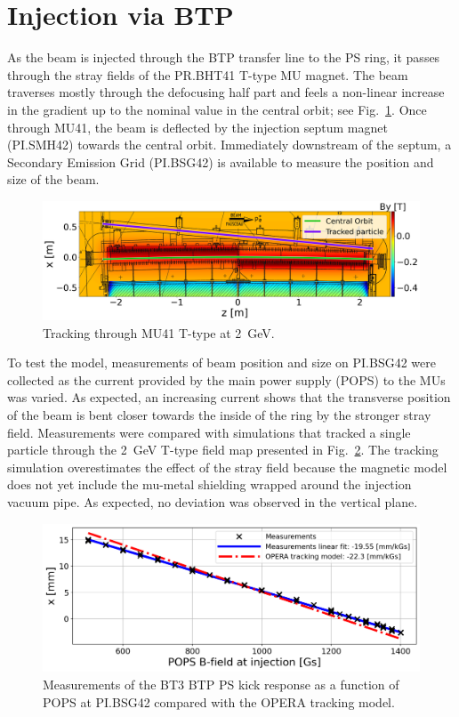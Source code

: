 \documentclass[a4paper,
               biblatex,     %
               keeplastbox,   %
               ]{jacow}
\begin{document}
\section{Injection via BTP}
As the beam is injected through the BTP transfer line to the PS ring, it passes through the stray fields of the PR.BHT41 T-type MU magnet. The beam traverses mostly through the defocusing half part and feels a non-linear increase in the gradient up to the nominal value in the central orbit; see Fig.~\ref{fig:injection_btp}. Once through MU41, the beam is deflected by the injection septum magnet (PI.SMH42) towards the central orbit. Immediately downstream of the septum, a Secondary Emission Grid (PI.BSG42) is available to measure the position and size of the beam.

\begin{figure}[!htb]
   \centering
   \includegraphics*[width=1.0\columnwidth]{MOPOTK030_f4.png}
   \caption{Tracking through MU41 T-type at \SI{2}{GeV}.}
   \label{fig:injection_btp}
\end{figure}

To test the model, measurements of beam position and size on PI.BSG42 were collected as the current provided by the main power supply (POPS) to the MUs was varied. As expected, an increasing current shows that the transverse position of the beam is bent closer towards the inside of the ring by the stronger stray field. Measurements were compared with simulations that tracked a single particle through the \SI{2}{GeV} T-type field map presented in Fig.~\ref{fig:injection_btp_transverse_position}. The tracking simulation overestimates the effect of the stray field because the magnetic model does not yet include the mu-metal shielding wrapped around the injection vacuum pipe. As expected, no deviation was observed in the vertical plane.

\begin{figure}[!htb]
   \centering
   \includegraphics*[width=1.0\columnwidth]{MOPOTK030_f5.png}
   \caption{Measurements of the BT3 BTP PS kick response as a function of POPS at PI.BSG42 compared with the OPERA tracking model.}
   \label{fig:injection_btp_transverse_position}
\end{figure}
\end{document}
